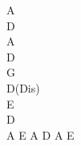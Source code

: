 \begin{chordw}
    A\\
    D\\
    A\\
    D\\
    G\\
    D(Dis)\\
    E\\
    D\\
    A E A D A E
\end{chordw}